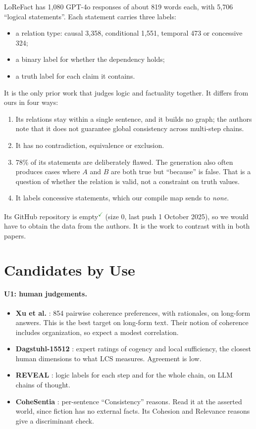 \documentclass[10pt]{article}
\newcommand{\LCS}{\mathrm{LCS}}
\newcommand{\ok}{\textsuperscript{\textcolor{ForestGreen}{\ensuremath{\checkmark}}}}
\begin{document}
LoReFact \citep{lorefact} has 1{,}080 GPT-4o responses of about 819 words each, with 5{,}706
``logical statements''. Each statement carries three labels:
\begin{itemize}
\item a relation type: causal 3{,}358, conditional 1{,}551, temporal 473 or concessive 324;
\item a binary label for whether the dependency holds;
\item a truth label for each claim it contains.
\end{itemize}
It is the only prior work that judges logic and factuality together. It differs from ours in four
ways:
\begin{enumerate}
\item Its relations stay within a single sentence, and it builds no graph; the authors note that it
  does not guarantee global consistency across multi-step chains.
\item It has no contradiction, equivalence or exclusion.
\item 78\% of its statements are deliberately flawed. The generation also often produces cases where
  $A$ and $B$ are both true but ``because'' is false. That is a question of whether the relation is
  valid, not a constraint on truth values.
\item It labels concessive statements, which our compile map sends to \emph{none}.
\end{enumerate}
Its GitHub repository is empty\ok{} (size 0, last push 1 October 2025), so we would have to obtain
the data from the authors. It is the work to contrast with in both papers.

\section{Candidates by Use}

\paragraph{U1: human judgements.}
\begin{itemize}
\item \textbf{Xu et al.} \citep{xu2023lfqa}: 854 pairwise coherence preferences, with rationales, on
  long-form answers. This is the best target on long-form text. Their notion of coherence includes
  organization, so expect a modest correlation.
\item \textbf{Dagstuhl-15512} \citep{wachsmuth2017}: expert ratings of cogency and local
  sufficiency, the closest human dimensions to what $\LCS$ measures. Agreement is low.
\item \textbf{REVEAL} \citep{reveal}: logic labels for each step and for the whole chain, on LLM
  chains of thought.
\item \textbf{CoheSentia} \citep{cohesentia}: per-sentence ``Consistency'' reasons. Read it at the
  asserted world, since fiction has no external facts. Its Cohesion and Relevance reasons give a
  discriminant check.
\end{itemize}
\end{document}
